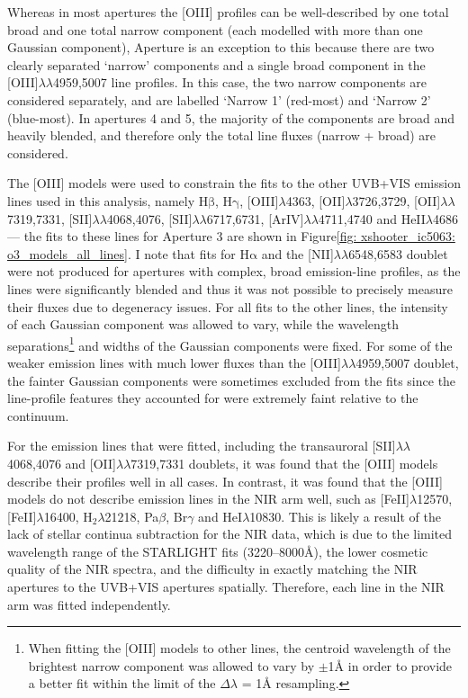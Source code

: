Whereas in most apertures the [OIII] profiles can be well-described by one total broad and one total narrow component (each modelled with more than one Gaussian component), Aperture is an exception to this because there are two clearly separated `narrow' components and a single broad component in the [OIII]$\lambda\lambda$4959,5007 line profiles. In this case, the two narrow components are considered separately, and are labelled `Narrow 1' (red-most) and `Narrow 2' (blue-most). In apertures 4 and 5, the majority of the components are broad and heavily blended, and therefore only the total line fluxes (narrow + broad) are considered.

The [OIII] models were used to constrain the fits to the other UVB+VIS emission lines used in this analysis, namely H$\mathrm{\beta}$, H$\mathrm{\gamma}$, [OIII]$\lambda$4363, [OII]$\lambda$3726,3729, [OII]$\lambda\lambda$7319,7331, [SII]$\lambda\lambda$4068,4076, [SII]$\lambda\lambda$6717,6731, [ArIV]$\lambda\lambda$4711,4740 and HeII$\lambda$4686 --- the fits to these lines for Aperture 3 are shown in Figure\;\ref{fig: xshooter_ic5063: o3_models_all_lines}. I note that fits for H$\mathrm{\alpha}$ and the [NII]$\lambda\lambda$6548,6583 doublet were not produced for apertures with complex, broad emission-line profiles, as the lines were significantly blended and thus it was not possible to precisely measure their fluxes due to degeneracy issues. For all fits to the other lines, the intensity of each Gaussian component was allowed to vary, while the wavelength separations\footnote{When fitting the [OIII] models to other lines, the centroid wavelength of the brightest narrow component was allowed to vary by $\pm$1{\;\AA} in order to provide a better fit within the limit of the $\Delta\lambda$ = 1{\;\AA} resampling.} and widths of the Gaussian components were fixed. For some of the weaker emission lines with much lower fluxes than the [OIII]$\lambda\lambda$4959,5007 doublet, the fainter Gaussian components were sometimes excluded from the fits since the line-profile features they accounted for were extremely faint relative to the continuum.

For the emission lines that were fitted, including the transauroral [SII]$\lambda\lambda$4068,4076 and [OII]$\lambda\lambda$7319,7331 doublets, it was found that the [OIII] models describe their profiles well in all cases. In contrast, it was found that the [OIII] models do not describe emission lines in the NIR arm well, such as [FeII]$\lambda$12570, [FeII]$\lambda$16400, H$_2 \lambda$21218, Pa$\beta$, Br$\gamma$ and HeI$\lambda$10830. This is likely a result of the lack of stellar continua subtraction for the NIR data, which is due to the limited wavelength range of the \textsc{STARLIGHT} fits (3220--8000\;\AA), the lower cosmetic quality of the NIR spectra, and the difficulty in exactly matching the NIR apertures to the UVB+VIS apertures spatially. Therefore, each line in the NIR arm was fitted independently. \\

